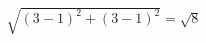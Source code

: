 \documentclass[preview]{standalone}
\begin{document}
\begin{align*}
\sqrt{(3 - 1)^2 + (3 - 1)^2} = \sqrt{8}
\end{align*}
\end{document}
